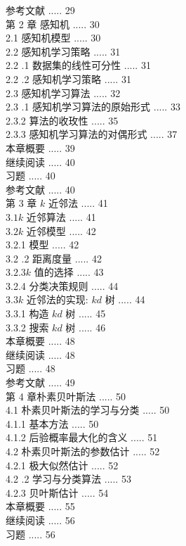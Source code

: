 \documentclass[10pt]{article}
\begin{document}
\begin{CJK*}{UTF8}{bsmi}
参考文献 ..... 29\\
第 2 章 感知机 ..... 30\\
2.1 感知机模型 ..... 30\\
2.2 感知机学习策略 ..... 31\\
2.2 .1 数据集的线性可分性 ..... 31\\
2.2 .2 感知机学习策略 ..... 31\\
2.3 感知机学习算法 ..... 32\\
2.3 .1 感知机学习算法的原始形式 ..... 33\\
2.3.2 算法的收玫性 ..... 35\\
2.3.3 感知机学习算法的对偶形式 ..... 37\\
本章概要 ..... 39\\
继续阅读 ..... 40\\
习题 ..... 40\\
参考文献 ..... 40\\
第 3 章 $k$ 近邻法 ..... 41\\
$3.1 k$ 近邻算法 ..... 41\\
$3.2 k$ 近邻模型 ..... 42\\
3.2.1 模型 ..... 42\\
3.2 .2 距离度量 ..... 42\\
$3.2 .3 k$ 值的选择 ..... 43\\
3.2.4 分类决策规则 ..... 44\\
$3.3 k$ 近邻法的实现: $k d$ 树 ..... 44\\
3.3.1 构造 $k d$ 树 ..... 45\\
3.3.2 搜索 $k d$ 树 ..... 46\\
本章概要 ..... 48\\
继续阅读 ..... 48\\
习题 ..... 48\\
参考文献 ..... 49\\
第 4 章朴素贝叶斯法 ..... 50\\
4.1 朴素贝叶斯法的学习与分类 ..... 50\\
4.1.1 基本方法 ..... 50\\
4.1.2 后验概率最大化的含义 ..... 51\\
4.2 朴素贝叶斯法的参数估计 ..... 52\\
4.2.1 极大似然估计 ..... 52\\
4.2 .2 学习与分类算法 ..... 53\\
4.2.3 贝叶斯估计 ..... 54\\
本章概要 ..... 55\\
继续阅读 ..... 56\\
习题 ..... 56\\

\end{CJK*}
\end{document}
